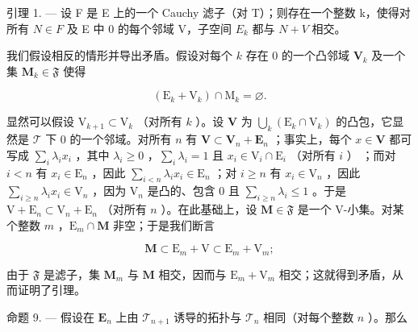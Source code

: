 引理 1. --- 设 F 是 E 上的一个 Cauchy 滤子（对 T）；则存在一个整数 k，使得对所有 \(N \in F\) 及 E 中 0 的每个邻域 V，子空间 \(E_{k}\) 都与 \(N + V\) 相交。

我们假设相反的情形并导出矛盾。假设对每个 \(k\) 存在 0 的一个凸邻域 \(\mathbf{V}_k\) 及一个集 \(\mathbf{M}_k \in \mathfrak{F}\) 使得

\[
\left(\mathrm{E} _ {k} + \mathrm{V} _ {k}\right) \cap \mathrm{M} _ {k} = \varnothing .
\]

显然可以假设 \(\mathrm{V}_{k + 1} \subset \mathrm{V}_k\) （对所有 \(k\) ）。设 \(\mathbf{V}\) 为 \(\bigcup_{k} (\mathrm{E}_k \cap \mathrm{V}_k)\) 的凸包，它显然是 \(\mathcal{T}\) 下 0 的一个邻域。对所有 \(n\) 有 \(\mathbf{V} \subset \mathbf{V}_n + \mathbf{E}_n\) ；事实上，每个 \(x \in \mathbf{V}\) 都可写成 \(\sum_{i} \lambda_i x_i\) ，其中 \(\lambda_i \geqslant 0\) ，\(\sum_{i} \lambda_i = 1\) 且 \(x_i \in \mathrm{V}_i \cap \mathrm{E}_i\) （对所有 \(i\) ） ；而对 \(i < n\) 有 \(x_i \in \mathrm{E}_n\) ，因此 \(\sum_{i < n} \lambda_i x_i \in \mathrm{E}_n\) ；对 \(i \geqslant n\) 有 \(x_i \in \mathrm{V}_n\) ，因此 \(\sum_{i \geqslant n} \lambda_i x_i \in \mathrm{V}_n\) ，因为 \(\mathrm{V}_n\) 是凸的、包含 0 且 \(\sum_{i \geqslant n} \lambda_i \leqslant 1\) 。于是 \(\mathrm{V} + \mathrm{E}_n \subset \mathrm{V}_n + \mathrm{E}_n\) （对所有 \(n\) ）。在此基础上，设 \(\mathbf{M} \in \mathfrak{F}\) 是一个 V-小集。对某个整数 \(m\) ，\(\mathrm{E}_m \cap \mathbf{M}\) 非空；于是我们断言

\[
\mathbf {M} \subset \mathrm{E} _ {m} + \mathrm{V} \subset \mathrm{E} _ {m} + \mathrm{V} _ {m};
\]

由于 \(\mathfrak{F}\) 是滤子，集 \(\mathbf{M}_m\) 与 \(\mathbf{M}\) 相交，因而与 \(\mathrm{E}_m + \mathrm{V}_m\) 相交；这就得到矛盾，从而证明了引理。

命题 9. --- 假设在 \(\mathbf{E}_n\) 上由 \(\mathcal{T}_{n+1}\) 诱导的拓扑与 \(\mathcal{T}_n\) 相同（对每个整数 \(n\) ）。那么

